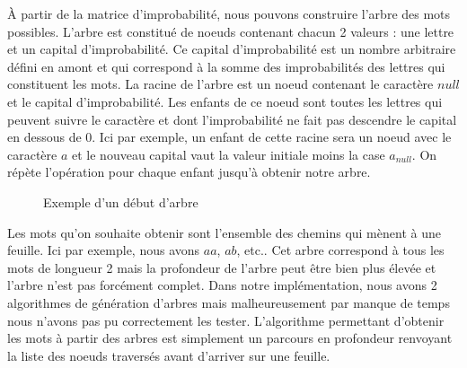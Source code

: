 \documentclass[french,12pt]{article}
\begin{document}
       \indent À partir de la matrice d'improbabilité, nous pouvons construire l'arbre des mots possibles. L'arbre est constitué de noeuds contenant chacun 2 valeurs : une lettre et un capital d'improbabilité. Ce capital d'improbabilité est un nombre arbitraire défini en amont et qui correspond à la somme des improbabilités des lettres qui constituent les mots. La racine de l'arbre est un noeud contenant le caractère $null$ et le capital d'improbabilité. Les enfants de ce noeud sont toutes les lettres qui peuvent suivre le caractère et dont l'improbabilité ne fait pas descendre le capital en dessous de 0. Ici par exemple, un enfant de cette racine sera un noeud avec le caractère $a$ et le nouveau capital vaut la valeur initiale moins la case ${a}_{null}$. On répète l'opération pour chaque enfant jusqu'à obtenir notre arbre.
        \begin{figure}[hbt!]
            \centering
         \caption{Exemple d'un début d'arbre}
        \end{figure}
        \newline
   
        \indent
        
        Les mots qu'on souhaite obtenir sont l'ensemble des chemins qui mènent à une feuille. Ici par exemple, nous avons $aa$, $ab$, etc.. Cet arbre correspond à tous les mots de longueur 2 mais la profondeur de l'arbre peut être bien plus élevée et l'arbre n'est pas forcément complet.
            \newline
            \indent Dans notre implémentation, nous avons 2 algorithmes de génération d'arbres mais malheureusement par manque de temps nous n'avons pas pu correctement les tester. L'algorithme permettant d'obtenir les mots à partir des arbres est simplement un parcours en profondeur renvoyant la liste des noeuds traversés avant d'arriver sur une feuille. 
    
\end{document}
